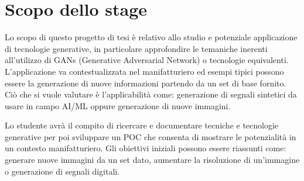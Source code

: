 \section*{Scopo dello stage}
Lo scopo di questo progetto di tesi è relativo allo studio e potenziale applicazione di tecnologie generative, in particolare approfondire le temaniche inerenti all'utilizzo di GANs (Generative Adversarial Network) o tecnologie equivalenti. L'applicazione va contestualizzata nel manifatturiero ed esempi tipici possono essere la generazione di nuove informazioni partendo da un set di base fornito. Ciò che si vuole valutare è l'applicabilità come: generazione di segnali sintetici da usare in campo AI/ML oppure generazione di nuove immagini.

Lo studente avrà il compito di ricercare e documentare tecniche e tecnologie generative per poi sviluppare un POC che consenta di mostrare le potenzialità in un contesto manifatturiero. Gli obiettivi iniziali possono essere riassunti come: generare nuove immagini da un set dato, aumentare la risoluzione di un'immagine o generazione di segnali digitali.

